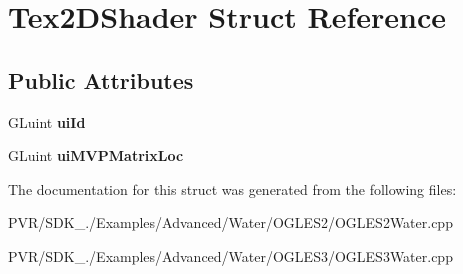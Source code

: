 \hypertarget{struct_tex2_d_shader}{\section{Tex2\+D\+Shader Struct Reference}
\label{struct_tex2_d_shader}
}
\subsection*{Public Attributes}
\begin{DoxyCompactItemize}
\item 
\hypertarget{struct_tex2_d_shader_a852a878aeb8fef235a2e867c51e01d92}{G\+Luint {\bfseries ui\+Id}}\label{struct_tex2_d_shader_a852a878aeb8fef235a2e867c51e01d92}

\item 
\hypertarget{struct_tex2_d_shader_ad94ff6ede2bdcc176a4af5f8147255a0}{G\+Luint {\bfseries ui\+M\+V\+P\+Matrix\+Loc}}\label{struct_tex2_d_shader_ad94ff6ede2bdcc176a4af5f8147255a0}

\end{DoxyCompactItemize}


The documentation for this struct was generated from the following files\+:\begin{DoxyCompactItemize}
\item 
P\+V\+R/\+S\+D\+K\+\_./\+Examples/\+Advanced/\+Water/\+O\+G\+L\+E\+S2/O\+G\+L\+E\+S2\+Water.\+cpp\item 
P\+V\+R/\+S\+D\+K\+\_./\+Examples/\+Advanced/\+Water/\+O\+G\+L\+E\+S3/O\+G\+L\+E\+S3\+Water.\+cpp\end{DoxyCompactItemize}
